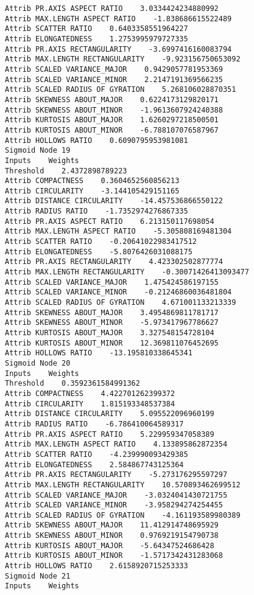 \documentclass[
	article,			%
	11pt,				%
	oneside,			%
	a4paper,			%
	english,			%
	brazil,				%
	sumario=tradicional
	]{abntex2}
\begin{document}
\begin{lstlisting}
Attrib PR.AXIS ASPECT RATIO    3.0334424234880992
Attrib MAX.LENGTH ASPECT RATIO    -1.838686615522489
Attrib SCATTER RATIO    0.6403358551964227
Attrib ELONGATEDNESS    1.2753995979727335
Attrib PR.AXIS RECTANGULARITY    -3.6997416160083794
Attrib MAX.LENGTH RECTANGULARITY    -9.923156750653092
Attrib SCALED VARIANCE_MAJOR    0.9429057781953369
Attrib SCALED VARIANCE_MINOR    2.2147191369566235
Attrib SCALED RADIUS OF GYRATION    5.268106028870351
Attrib SKEWNESS ABOUT_MAJOR    0.6224173129820171
Attrib SKEWNESS ABOUT_MINOR    -1.9613607924240388
Attrib KURTOSIS ABOUT_MAJOR    1.6260297218500501
Attrib KURTOSIS ABOUT_MINOR    -6.788107076587967
Attrib HOLLOWS RATIO    0.6090795953981081
Sigmoid Node 19
Inputs    Weights
Threshold    2.4372898789223
Attrib COMPACTNESS    0.3604652560856213
Attrib CIRCULARITY    -3.144105429151165
Attrib DISTANCE CIRCULARITY    -14.457536866550122
Attrib RADIUS RATIO    -1.7352974276867335
Attrib PR.AXIS ASPECT RATIO    6.213150117698054
Attrib MAX.LENGTH ASPECT RATIO    -5.305808169481304
Attrib SCATTER RATIO    -0.20641022983417512
Attrib ELONGATEDNESS    -5.8076426031088175
Attrib PR.AXIS RECTANGULARITY    4.423302502877774
Attrib MAX.LENGTH RECTANGULARITY    -0.30071426413093477
Attrib SCALED VARIANCE_MAJOR    1.475424586197155
Attrib SCALED VARIANCE_MINOR    -0.21246860036481804
Attrib SCALED RADIUS OF GYRATION    4.671001133213339
Attrib SKEWNESS ABOUT_MAJOR    3.4954869811781717
Attrib SKEWNESS ABOUT_MINOR    -5.973417967786627
Attrib KURTOSIS ABOUT_MAJOR    3.327548154728104
Attrib KURTOSIS ABOUT_MINOR    12.369811076452695
Attrib HOLLOWS RATIO    -13.195810338645341
Sigmoid Node 20
Inputs    Weights
Threshold    0.3592361584991362
Attrib COMPACTNESS    4.422701262399372
Attrib CIRCULARITY    1.815193348537384
Attrib DISTANCE CIRCULARITY    5.095522096960199
Attrib RADIUS RATIO    -6.786410064589317
Attrib PR.AXIS ASPECT RATIO    5.229959347058389
Attrib MAX.LENGTH ASPECT RATIO    4.133895862872354
Attrib SCATTER RATIO    -4.239990093429385
Attrib ELONGATEDNESS    2.584867743125364
Attrib PR.AXIS RECTANGULARITY    -5.273176295597297
Attrib MAX.LENGTH RECTANGULARITY    10.570893462699512
Attrib SCALED VARIANCE_MAJOR    -3.0324041430721755
Attrib SCALED VARIANCE_MINOR    -3.958294274254455
Attrib SCALED RADIUS OF GYRATION    -4.161193589980389
Attrib SKEWNESS ABOUT_MAJOR    11.412914748695929
Attrib SKEWNESS ABOUT_MINOR    0.9769219154790738
Attrib KURTOSIS ABOUT_MAJOR    -5.64347524686428
Attrib KURTOSIS ABOUT_MINOR    -1.5717342431283068
Attrib HOLLOWS RATIO    2.6158920715253333
Sigmoid Node 21
Inputs    Weights

\end{lstlisting}
\end{document}
